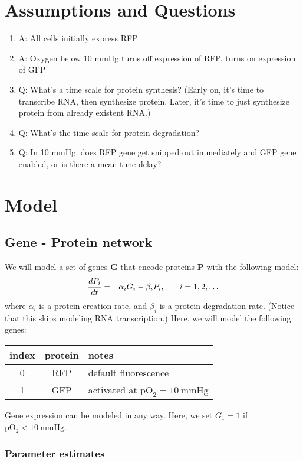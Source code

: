 \documentclass[12pt]{article}
\renewcommand{\vec}[1]{\mathbf{#1}}
\newcommand{\oxy}{  {\textrm{pO}_2} }
\newcommand{\mmHg}{\: \textrm{mmHg} }
\begin{document}
\section{Assumptions and Questions}
\begin{enumerate}

\item 
A: All cells initially express RFP

\item 
A: Oxygen below 10 mmHg turns off expression of RFP, turns on expression of GFP

\item 
Q: What's a time scale for protein synthesis? (Early on, it's time to transcribe RNA, then synthesize protein. Later, it's time to just synthesize protein from already existent RNA.) 

\item 
Q: What's the time scale for protein degradation? 

\item 
Q: In 10 mmHg, does RFP gene get snipped out immediately and GFP gene enabled, or is there a mean time delay? 


\end{enumerate}

\section{Model}

\subsection{Gene - Protein network}
We will model a set of genes $\vec{G}$ that encode proteins $\vec{P}$ with the following model: 
\begin{eqnarray}
\frac{ d P_i }{dt} & = & \alpha_i G_i - \beta_i P_i, \hspace{.25in} i = 1, 2, \ldots 
\end{eqnarray}
where $\alpha_i$ is a protein creation rate, and $\beta_i$ is a protein degradation rate. (Notice that this 
skips modeling RNA transcription.) Here, we will model the following genes: \\

\begin{center}
\begin{tabular}{c|c|l}
index & protein & notes \\
 \hline 
 0 & RFP & default fluorescence \\
 1 & GFP & activated at $\oxy = 10 \mmHg $ 
\end{tabular}
\end{center}

Gene expression can be modeled in any way. Here, we set $G_1 =1$ if $\oxy < 10 \mmHg$. 

\subsubsection{Parameter estimates}
\end{document}
